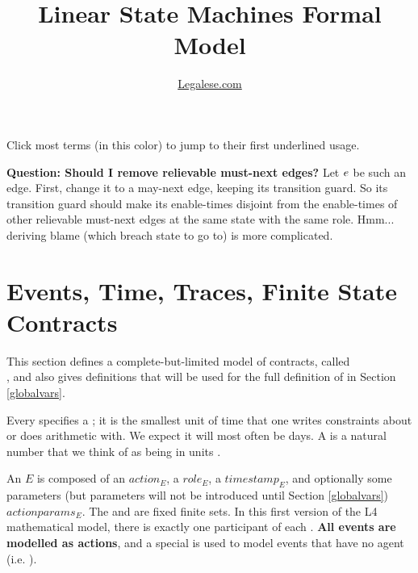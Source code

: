 \documentclass[12pt]{article}
\author{\href{https://legalese.com}{Legalese.com}}
\title{Linear State Machines Formal Model}
\begin{document}
\maketitle



\noindent Click most terms (in \color{TermColor}this color\color{black}) to jump to their first underlined usage.

{\bf Question: Should I remove relievable must-next edges?} Let $e$ be such an edge. First, change it to a may-next edge, keeping its transition guard. So its transition guard should make its enable-times disjoint from the enable-times of other relievable must-next edges at the same state with the same role. Hmm... deriving blame (which breach state to go to) is more complicated.

\tableofcontents



\section{Events, Time, Traces, Finite State Contracts} \label{basics}

This section defines a complete-but-limited model of contracts, called \\ , and also gives definitions that will be used for the full definition of  in Section \ref{globalvars}.

Every \Contract specifies a ; it is the smallest unit of time that one writes constraints about or does arithmetic with. We expect it will most often be days. A  is a natural number that we think of as being in units \TimeUnit.

An  $E$ is composed of an  $action_E$, a  $role_E$, a \TimeStamp $timestamp_E$, and optionally some parameters (but parameters will not be introduced until Section \ref{globalvars}) $actionparams_E$. The \Actions and \Roles are fixed finite sets. In this first version of the L4 mathematical model, there is exactly one participant of each \Role.
{\bf All events are modelled as actions}, and a special \Role {}  is used to model events that have no agent (i.e. \Role).
\end{document}
